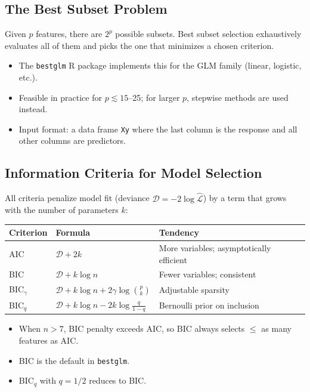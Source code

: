 \documentclass[11pt]{article}
\begin{document}
\subsection{The Best Subset Problem}
Given $p$ features, there are $2^p$ possible subsets. Best subset
selection exhaustively evaluates all of them and picks the one that
minimizes a chosen criterion.

\begin{itemize}
    \item The \texttt{bestglm} R package implements this for the GLM
      family (linear, logistic, etc.).
    \item Feasible in practice for $p \lesssim 15$--25; for larger
      $p$, stepwise methods are used instead.
    \item Input format: a data frame \texttt{Xy} where the last column
      is the response and all other columns are predictors.
\end{itemize}

\subsection{Information Criteria for Model Selection}
All criteria penalize model fit (deviance $\mathcal{D} = -2\log\hat{\mathcal{L}}$)
by a term that grows with the number of parameters $k$:

\begin{center}
\begin{tabular}{@{}lll@{}}
\toprule
\textbf{Criterion} & \textbf{Formula} & \textbf{Tendency} \\
\midrule
AIC  & $\mathcal{D} + 2k$ & More variables; asymptotically efficient \\
BIC  & $\mathcal{D} + k\log n$ & Fewer variables; consistent \\
BIC$_\gamma$ & $\mathcal{D} + k\log n + 2\gamma\log\binom{p}{k}$ & Adjustable sparsity \\
BIC$_q$  & $\mathcal{D} + k\log n - 2k\log\tfrac{q}{1-q}$ & Bernoulli prior on inclusion \\
\bottomrule
\end{tabular}
\end{center}

\begin{itemize}
    \item When $n > 7$, BIC penalty exceeds AIC, so BIC always selects
      $\leq$ as many features as AIC.
    \item BIC is the default in \texttt{bestglm}.
    \item BIC$_q$ with $q = 1/2$ reduces to BIC.
\end{itemize}
\end{document}
